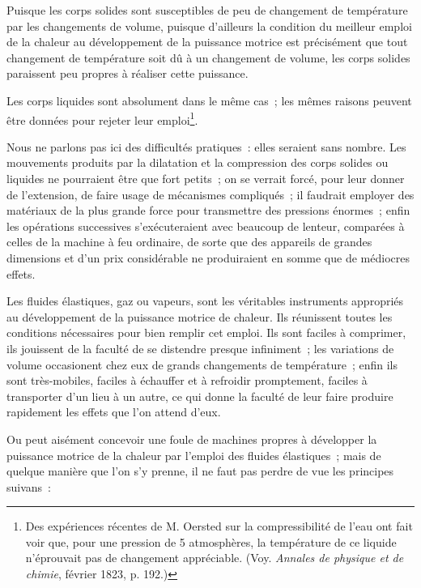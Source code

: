 \documentclass[french,twoside]{book} %
\begin{document}
\noindent Puisque les corps solides sont susceptibles de peu de changement de température par les changements de volume, puisque d’ailleurs la condition du meilleur emploi de la chaleur au développement de la puissance motrice est précisément que tout changement de température soit dû à un changement de volume, les corps solides paraissent peu propres à réaliser cette puissance.\par
Les corps liquides sont absolument dans le même cas ; les mêmes raisons peuvent être données pour rejeter leur emploi\footnote{Des expériences récentes de M. Oersted sur la compressibilité de l’eau ont fait voir que, pour une pression de 5 atmosphères, la température de ce liquide n’éprouvait pas de changement appréciable. (Voy. \emph{Annales de physique et de chimie}, février 1823, p. 192.)}.\par
Nous ne parlons pas ici des difficultés pratiques : elles seraient sans nombre. Les mouvements produits par la dilatation et la compression des corps solides ou liquides ne pourraient être que fort petits ; on se verrait forcé, pour leur donner de l’extension, de faire usage de mécanismes compliqués ; il faudrait employer des matériaux de la plus grande force pour transmettre des pressions énormes ; enfin les opérations successives s’exécuteraient avec beaucoup de lenteur, comparées à celles de la machine à feu ordinaire, de sorte que des appareils de grandes dimensions et d’un prix considérable ne produiraient en somme que de médiocres effets.\par
Les fluides élastiques, gaz ou vapeurs, sont les véritables instruments appropriés au développement de la puissance motrice de chaleur. Ils réunissent toutes les conditions nécessaires pour bien remplir cet emploi. Ils sont faciles à comprimer, ils jouissent de la faculté de se distendre presque infiniment ; les variations de volume occasionent chez eux de grands changements de température ; enfin ils sont très-mobiles, faciles à échauffer et à refroidir promptement, faciles à transporter d’un lieu à un autre, ce qui donne la faculté de leur faire produire rapidement les effets que l’on attend d’eux.\par
Ou peut aisément concevoir une foule de machines propres à développer la puissance motrice de la chaleur par l’emploi des fluides élastiques ; mais de quelque manière que l’on s’y prenne, il ne faut pas perdre de vue les principes suivans :\par
\end{document}
